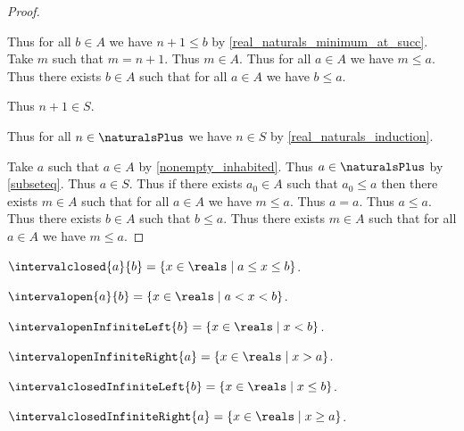 \begin{proof}
\begin{subproof}
\begin{subproof}
\begin{subproof}
\begin{byCase}
                    Thus for all $b\in A$ we have $n + 1 \leq b$ by \cref{real_naturals_minimum_at_succ}.
                    Take $m$ such that $m = n + 1$.
                    Thus $m\in A$.
                    Thus for all $a\in A$ we have $m \leq a$.
                    Thus there exists $b\in A$ such that for all $a\in A$ we have $b \leq a$.
                \end{byCase}
            \end{subproof}
            Thus $n + 1\in S$.
        \end{subproof}
        Thus for all $n\in\naturalsPlus$ we have $n\in S$ by \cref{real_naturals_induction}.
    \end{subproof}
    Take $a$ such that $a\in A$ by \cref{nonempty_inhabited}.
    Thus $a\in\naturalsPlus$ by \cref{subseteq}.
    Thus $a\in S$.
    Thus if there exists $a_0\in A$ such that $a_0 \leq a$ then there exists $m\in A$ such that for all $a\in A$ we have $m \leq a$.
    Thus $a = a$.
    Thus $a \leq a$.
    Thus there exists $b\in A$ such that $b \leq a$.
    Thus there exists $m\in A$ such that for all $a\in A$ we have $m \leq a$.
\end{proof}

\begin{definition}\label{intervalclosed}
    $\intervalclosed{a}{b} = \{x \in \reals \mid a \leq x \leq b\}$.
\end{definition}

\begin{definition}\label{intervalopen}
    $\intervalopen{a}{b} = \{ x \in \reals \mid a < x < b\}$.
\end{definition}

\begin{definition}\label{intervalopen_infinite_left}
    $\intervalopenInfiniteLeft{b} = \{ x \in \reals \mid x < b\}$.
\end{definition}

\begin{definition}\label{intervalopen_infinite_right}
    $\intervalopenInfiniteRight{a} = \{ x \in \reals \mid x > a\}$.
\end{definition}

\begin{definition}\label{intervalclosed_infinite_left}
    $\intervalclosedInfiniteLeft{b} = \{ x \in \reals \mid x \leq b\}$.
\end{definition}

\begin{definition}\label{intervalclosed_infinite_right}
    $\intervalclosedInfiniteRight{a} = \{ x \in \reals \mid x \geq a\}$.
\end{definition}


